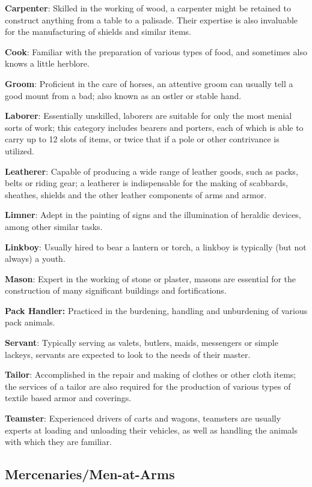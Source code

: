\documentclass{article}
\begin{document}
\begin{multicols}{2}
\textbf{Carpenter}: Skilled in the working of wood, a carpenter might be
retained to construct anything from a table to a palisade. Their
expertise is also invaluable for the manufacturing of shields and
similar items.

\textbf{Cook}: Familiar with the preparation of various types of food,
and sometimes also knows a little herblore.

\textbf{Groom}: Proficient in the care of horses, an attentive groom can
usually tell a good mount from a bad; also known as an ostler or stable
hand.

\textbf{Laborer}: Essentially unskilled, laborers are suitable for only
the most menial sorts of work; this category includes bearers and
porters, each of which is able to carry up to 12 slots of items, or
twice that if a pole or other contrivance is utilized.

\textbf{Leatherer}: Capable of producing a wide range of leather goods,
such as packs, belts or riding gear; a leatherer is indispensable for
the making of scabbards, sheathes, shields and the other leather
components of arms and armor.

\textbf{Limner}: Adept in the painting of signs and the illumination of
heraldic devices, among other similar tasks.

\textbf{Linkboy}: Usually hired to bear a lantern or torch, a linkboy is
typically (but not always) a youth.

\textbf{Mason}: Expert in the working of stone or plaster, masons are
essential for the construction of many significant buildings and
fortifications.

\textbf{Pack Handler:} Practiced in the burdening, handling and
unburdening of various pack animals.

\textbf{Servant}: Typically serving as valets, butlers, maids,
messengers or simple lackeys, servants are expected to look to the needs
of their master.

\textbf{Tailor}: Accomplished in the repair and making of clothes or
other cloth items; the services of a tailor are also required for the
production of various types of textile based armor and coverings.

\textbf{Teamster}: Experienced drivers of carts and wagons, teamsters
are usually experts at loading and unloading their vehicles, as well as
handling the animals with which they are familiar.

\subsection{Mercenaries/Men-at-Arms}\label{mercenariesmen-at-arms}


\end{multicols}
\end{document}
